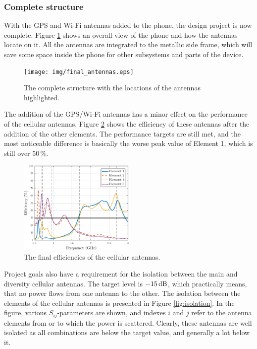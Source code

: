 \subsubsection{Complete structure}
\label{sec:complete_structure}
With the GPS and Wi-Fi antennas added to the phone, the design project is now complete. Figure \ref{fig:complete_struct} shows an overall view of the phone and how the antennas locate on it. All the antennas are integrated to the metallic side frame, which will save some space inside the phone for other subsystems and parts of the device.

\begin{figure}[H]
    \centering
    \texttt{[image: img/final\_antennas.eps]}
    \caption{The complete structure with the locations of the antennas highlighted.}
    \label{fig:complete_struct}
\end{figure}

The addition of the GPS/Wi-Fi antennas has a minor effect on the performance of the cellular antennas. Figure \ref{fig:cellular_final_eff} shows the efficiency of these antennas after the addition of the other elements. The performance targets are still met, and the most noticeable difference is basically the worse peak value of Element 1, which is still over $50\,\%$.
\begin{figure}[H]
    \centering
    \includegraphics[width=0.5\textwidth]{img/diversity_eff_wgps.eps}
    \caption{The final efficiencies of the cellular antennas.}
    \label{fig:cellular_final_eff}
\end{figure}

Project goals also have a requirement for the isolation between the main and diversity cellular antennas. The target level is $-15\,\mathrm{dB}$, which practically means, that no power flows from one antenna to the other. The isolation between the elements of the cellular antennas is presented in Figure \ref{fig:isolation}. In the figure, various $S_{ij}$-parameters are shown, and indexes $i$ and $j$ refer to the antenna elements from or to which the power is scattered. Clearly, these antennas are well isolated as all combinations are below the target value, and generally a lot below it.

